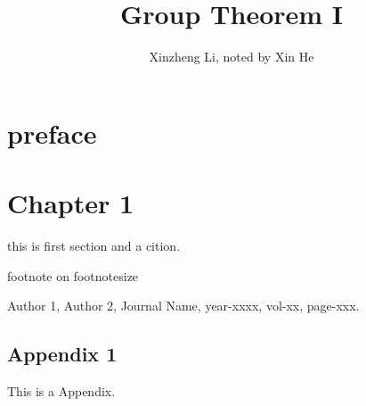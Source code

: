 \documentclass[UTF8,a4paper,11pt]{book}
\title{\Huge Group Theorem I}
\author{Xinzheng Li, noted by Xin He}
\date{}
\begin{document}
\maketitle     %
\thispagestyle{empty}

\chapter*{preface}
\thispagestyle{empty}
\newpage

\setcounter{page}{1}
\tableofcontents  %

\newpage
\setcounter{page}{1}



\chapter{Chapter 1}
this is first section and a cition\cite{1}.

\footnotesize{\centering footnote on footnotesize}




\begin{thebibliography}{9}
 Author 1, Author 2, Journal Name, year-xxxx, vol-xx, page-xxx.
\end{thebibliography}


\begin{appendix}              
\section{Appendix 1}
This is a Appendix.
\end{appendix}
\end{document}
